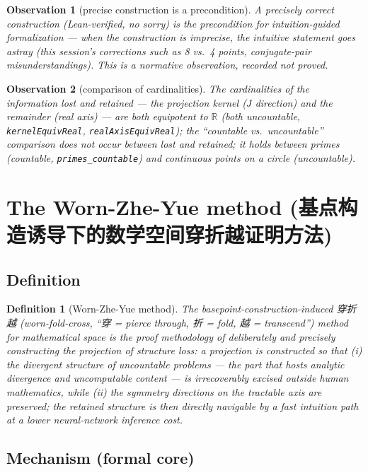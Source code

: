 \documentclass[11pt]{article}
\newtheorem{definition}{Definition}
\newtheorem{observation}{Observation}
\theoremstyle{remark}
\begin{document}
\begin{observation}[precise construction is a precondition]
\label{obs:precision}
A precisely correct construction (Lean-verified, no sorry) is the
precondition for intuition-guided formalization --- when the construction is
imprecise, the intuitive statement goes astray (this session's corrections
such as 8 vs.\ 4 points, conjugate-pair misunderstandings). This is a
normative observation, recorded not proved.
\end{observation}

\begin{observation}[comparison of cardinalities]
\label{obs:cardinality}
The cardinalities of the information lost and retained --- the projection
kernel ($J$ direction) and the remainder (real axis) --- are both equipotent
to $\mathbb{R}$ (both uncountable, \texttt{kernelEquivReal},
\texttt{realAxisEquivReal}); the ``countable vs.\ uncountable'' comparison
does not occur between lost and retained; it holds between primes
(countable, \texttt{primes\_countable}) and continuous points on a circle
(uncountable).
\end{observation}

\section{The Worn-Zhe-Yue method (基点构造诱导下的数学空间穿折越证明方法)}
\label{sec:wzy}

\subsection{Definition}

\begin{definition}[Worn-Zhe-Yue method]
\label{def:wzy}
The \emph{basepoint-construction-induced 穿折越 (worn-fold-cross, ``穿 =
pierce through, 折 = fold, 越 = transcend'') method for mathematical space} is
the proof methodology of deliberately and precisely constructing the
projection of structure loss: a projection is constructed so that (i) the
divergent structure of uncountable problems --- the part that hosts analytic
divergence and uncomputable content --- is irrecoverably excised outside
human mathematics, while (ii) the symmetry directions on the tractable axis
are preserved; the retained structure is then directly navigable by a
\emph{fast intuition path} at a \emph{lower neural-network inference cost}.
\end{definition}

\subsection{Mechanism (formal core)}
\end{document}
